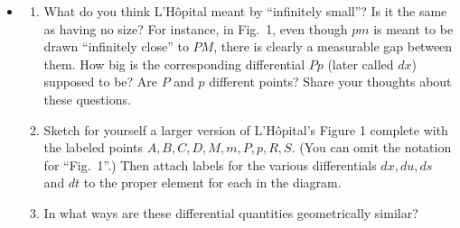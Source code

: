 \message{ !name(LHopitalsRule_2021.03.29.tex)}\documentclass[11pt]{article}
\newcounter{tasknumb}
\newcommand{\tasknumb}[1]{\refstepcounter{tasknumb}\textmd{\textbf{$\fbox{$\fbox{Task \thetasknumb}$}$}}#1}
\newenvironment{task}[1][]%
 {\begin{itemize}
 \item[\tasknumb{#1}] }
{
    \end{itemize}    }%
\begin{document}
\begin{task}[\label{Differential}]
\begin{enumerate} \itemsep -10pt
\item[(a)] What do you think L'H\^opital meant by ``infinitely small''? Is it the same as having no size? For instance, in Fig.~1, even though $pm$ is meant to be drawn ``infinitely close'' to $PM$, there is clearly a measurable gap between them. How big is the corresponding differential $Pp$ (later called $dx$) supposed to be? Are $P$ and $p$ different points? Share your thoughts about these questions. \\
\item[(b)] Sketch for yourself a larger version of L'H\^opital's Figure 1 complete with the labeled points $A, B, C, D, M, m, P, p, R, S$. (You can omit the notation for ``Fig.~1''.) Then attach labels for the various differentials $dx, du, ds$ and $dt$ to the proper element for each in the diagram. \\
\item[(c)] In what ways are these differential quantities geometrically similar?
\end{enumerate}
\end{task}
\vspace{-0.25in}
\end{document}
